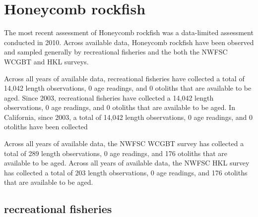 \documentclass[11pt,
  english,
  letterpaper,
]{article}
\begin{document}

\hypertarget{honeycomb-rockfish}{%
\section{Honeycomb rockfish}\label{honeycomb-rockfish}}

\leavevmode\tagmcend\tagstructend


The most recent assessment of Honeycomb rockfish was a data-limited assessment conducted in 2010. Across available data, Honeycomb rockfish have been observed and sampled generally by recreational fisheries and the both the NWFSC WCGBT and HKL surveys.

\leavevmode\tagmcend\tagstructend\par


Across all years of available data, recreational fisheries have collected a total of 14,042 length observations, 0 age readings, and 0 otoliths that are available to be aged. Since 2003, recreational fisheries have collected a 14,042 length observations, 0 age readings, and 0 otoliths that are available to be aged. In California, since 2003, a total of 14,042 length observations, 0 age readings, and 0 otoliths have been collected

\leavevmode\tagmcend\tagstructend\par


Across all years of available data, the NWFSC WCGBT survey has collected a total of 289 length observations, 0 age readings, and 176 otoliths that are available to be aged. Across all years of available data, the NWFSC HKL survey has collected a total of 203 length observations, 0 age readings, and 176 otoliths that are available to be aged.

\leavevmode\tagmcend\tagstructend\par


\hypertarget{recreational-fisheries-17}{%
\subsection{recreational fisheries}\label{recreational-fisheries-17}}
\end{document}
